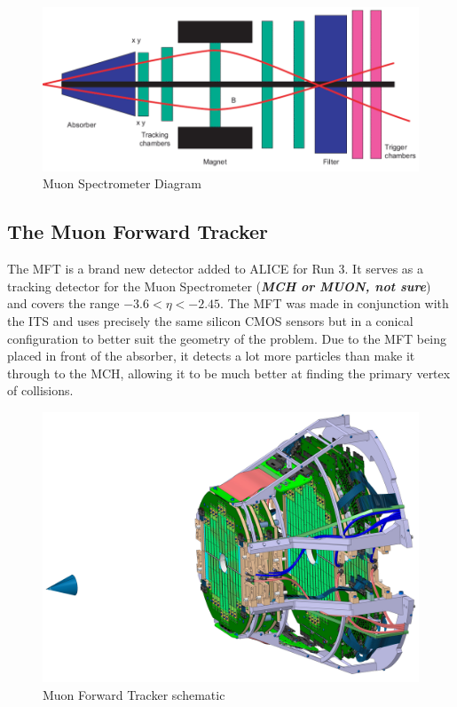\documentclass[11pt]{article}
\numberwithin{equation}{section}
\numberwithin{figure}{section}
\numberwithin{table}{section}
\begin{document}
\begin{figure}[h]
    \begin{center}
        \includegraphics[width=\textwidth]{Figs/MCH_schematic.png}
        \caption{Muon Spectrometer Diagram \cite{Muon_Spec_Schematic}}
        \label{fig:Muon Spectrometer}
    \end{center}
\end{figure}

\subsection{The Muon Forward Tracker}
The MFT is a brand new detector added to ALICE for Run 3. It serves as a tracking detector for the Muon Spectrometer (\textit{\textbf{MCH or MUON, not sure}}) and covers the range $-3.6<\eta<-2.45$. The MFT was made in conjunction with the ITS and uses precisely the same silicon CMOS sensors but in a conical configuration to better suit the geometry of the problem. Due to the MFT being placed in front of the absorber, it detects a lot more particles than make it through to the MCH, allowing it to be much better at finding the primary vertex of collisions.

\begin{figure}[h]
    \begin{center}
        \includegraphics[width=.8\textwidth]{Figs/MFT_schematic.jpg}
        \caption{Muon Forward Tracker schematic \cite{MFT_Schematic}}
        \label{fig:MFT Schematic}
    \end{center}
\end{figure}
\end{document}
